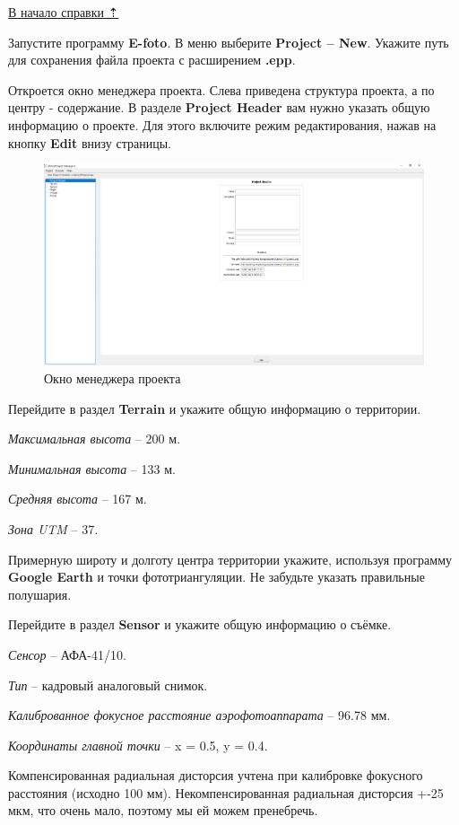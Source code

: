 \documentclass[
  12pt,
]{book}
\begin{document}
\protect\hyperlink{stereo}{В начало справки ⇡}

Запустите программу \textbf{E-foto}. В меню выберите \textbf{Project -- New}. Укажите путь для сохранения файла проекта с расширением \textbf{.epp}.

Откроется окно менеджера проекта. Слева приведена структура проекта, а по центру - содержание. В разделе \textbf{Project Header} вам нужно указать общую информацию о проекте. Для этого включите режим редактирования, нажав на кнопку \textbf{Edit} внизу страницы.

\begin{figure}
\centering
\includegraphics{images/Ref13/Project_Manager.png}
\caption{Окно менеджера проекта}
\end{figure}

Перейдите в раздел \textbf{Terrain} и укажите общую информацию о территории.

\emph{Максимальная высота} -- 200 м.

\emph{Минимальная высота} -- 133 м.

\emph{Средняя высота} -- 167 м.

\emph{Зона UTM} -- 37.

Примерную широту и долготу центра территории укажите, используя программу \textbf{Google Earth} и точки фототриангуляции. Не забудьте указать правильные полушария.

Перейдите в раздел \textbf{Sensor} и укажите общую информацию о съёмке.

\emph{Сенсор} -- АФА-41/10.

\emph{Тип} -- кадровый аналоговый снимок.

\emph{Калиброванное фокусное расстояние аэрофотоаппарата} -- 96.78 мм.

\emph{Координаты главной точки} -- x = 0.5, y = 0.4.

Компенсированная радиальная дисторсия учтена при калибровке фокусного расстояния (исходно 100 мм). Некомпенсированная радиальная дисторсия +-25 мкм, что очень мало, поэтому мы ей можем пренебречь.
\end{document}
